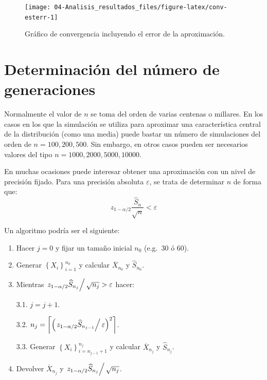 \documentclass[
]{book}
\theoremstyle{break}
\theoremstyle{definition}
\theoremstyle{definition}
\theoremstyle{definition}
\theoremstyle{remark}
\begin{document}
\begin{figure}[!htb]

{\centering \texttt{[image: 04-Analisis\_resultados\_files/figure-latex/conv-esterr-1]} 

}

\caption{Gráfico de convergencia incluyendo el error de la aproximación.}\label{fig:conv-esterr}
\end{figure}

\hypertarget{determinaciuxf3n-del-nuxfamero-de-generaciones}{%
\section{Determinación del número de generaciones}\label{determinaciuxf3n-del-nuxfamero-de-generaciones}}

Normalmente el valor de \(n\) se toma del orden de varias centenas o millares.
En los casos en los que la simulación se utiliza para aproximar una característica central de la distribución (como una media) puede bastar un número de simulaciones del orden de \(n = 100, 200, 500\).
Sin embargo, en otros casos pueden ser necesarios valores del tipo \(n = 1000, 2000, 5000, 10000\).

En muchas ocasiones puede interesar obtener una aproximación con un nivel de precisión fijado.
Para una precisión absoluta \(\varepsilon\), se trata de determinar
\(n\) de forma que:
\[z_{1-\alpha /2}\dfrac{\widehat{S}_{n}}{\sqrt{n}}<\varepsilon\]

Un algoritmo podría ser el siguiente:

\begin{enumerate}
\def\labelenumi{\arabic{enumi}.}
\item
  Hacer \(j=0\)
  y fijar un tamaño inicial \(n_{0}\) (e.g.~30 ó 60).
\item
  Generar \(\left\{ X_{i}\right\} _{i=1}^{n_{0}}\)
  y calcular \(\overline{X}_{n_0}\) y \(\widehat{S}_{n_{0}}\).
\item
  Mientras \(\left. z_{1-\alpha /2}\widehat{S}_{n_j}\right/ \sqrt{n_{j}}>\varepsilon\) hacer:

  3.1. \(j=j+1\).

  3.2. \(n_{j}=\left\lceil \left( \left. z_{1-\alpha /2}\widehat{S}  _{n_{j-1}}\right/ \varepsilon \right)^{2}\right\rceil\).

  3.3. Generar \(\left\{ X_{i}\right\}_{i=n_{j-1}+1}^{n_j}\)
  y calcular \(\overline{X}_{n_j}\) y \(\widehat{S}_{n_j}\).
\item
  Devolver \(\overline{X}_{n_j}\) y \(\left. z_{1-\alpha /2}\widehat{S}_{n_j}\right/ \sqrt{n_{j}}\).
\end{enumerate}
\end{document}
